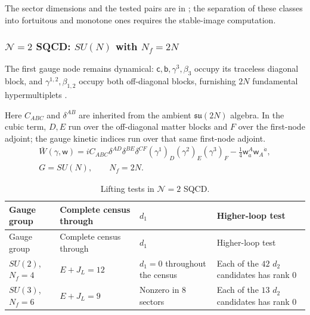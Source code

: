 \documentclass[11pt]{article}
\numberwithin{equation}{section}
\numberwithin{figure}{section}
\numberwithin{table}{section}
\begin{document}
The sector dimensions and the tested pairs are in \cite[supplement, Section S7.1]{Repo}; the separation of these classes into fortuitous and monotone ones requires the stable-image computation.

\subsubsection{$\mathcal N=2$ SQCD: $SU(N)$ with $N_f=2N$}\label{sec-results-SQCD}

The first gauge node remains dynamical: $\mathsf c,\mathsf b,\gamma^3,\beta_3$ occupy its traceless diagonal block, and $\gamma^{1,2},\beta_{1,2}$ occupy both off-diagonal blocks, furnishing $2N$ fundamental hypermultiplets \cite[results report, \S4.1]{Repo}.

Here $C_{ABC}$ and $\delta^{AB}$ are inherited from the ambient $\mathfrak{su}(2N)$ algebra. In the cubic term, $D,E$ run over the off-diagonal matter blocks and $F$ over the first-node adjoint; the gauge kinetic indices run over that same first-node adjoint.
\begin{equation}\label{local-ch9-sqcd-action}
\begin{gathered}
\bar W(\gamma,\mathsf w)
=iC_{ABC}\delta^{AD}\delta^{BE}\delta^{CF}
(\gamma^1)_D(\gamma^2)_E(\gamma^3)_F
-\frac14\mathsf w_{\dot a}^{A}\mathsf w_A{}^{\dot a},\\
G=SU(N),\qquad N_f=2N.
\end{gathered}
\end{equation}

{\footnotesize\renewcommand{\arraystretch}{1.3}\setlength{\tabcolsep}{3.5pt}
\begin{xltabular}{\linewidth}{|l|>{\raggedright\arraybackslash}p{2.6cm}|>{\raggedright\arraybackslash}X|>{\raggedright\arraybackslash}X|}
\caption{Lifting tests in $\mathcal N=2$ SQCD.}\label{local-ch9-sqcd-results}\\
\hline
Gauge group & Complete census through & $d_1$ & Higher-loop test\\
\hline\endfirsthead
\hline
Gauge group & Complete census through & $d_1$ & Higher-loop test\\
\hline\endhead
$SU(2)$, $N_f=4$ & $E+J_L=12$ & $d_1=0$ throughout the census & Each of the $42$ $d_2$ candidates has rank $0$\\
\hline
$SU(3)$, $N_f=6$ & $E+J_L=9$ & Nonzero in $8$ sectors \cite[supplement, Section S7.1]{Repo} & Each of the $13$ $d_2$ candidates has rank $0$\\
\hline
\end{xltabular}}
\end{document}
